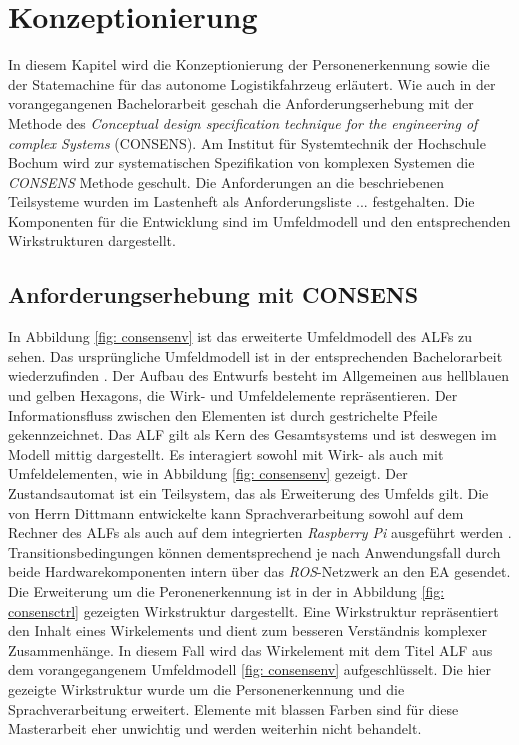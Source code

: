 \chapter{Konzeptionierung}
\label{ch: Konzeptionierung}

In diesem Kapitel wird die Konzeptionierung der Personenerkennung sowie die der Statemachine für das autonome Logistikfahrzeug erläutert. Wie auch in der vorangegangenen Bachelorarbeit geschah die Anforderungserhebung mit der Methode des \textit{Conceptual design specification technique for the engineering of complex Systems} (CONSENS). Am Institut für Systemtechnik der Hochschule Bochum wird zur systematischen Spezifikation von komplexen Systemen die \textit{CONSENS} Methode geschult. Die Anforderungen an die beschriebenen Teilsysteme wurden im Lastenheft als Anforderungsliste ... festgehalten. Die Komponenten für die Entwicklung sind im Umfeldmodell und den entsprechenden Wirkstrukturen dargestellt.
	
	
	\section{Anforderungserhebung mit CONSENS}
	\label{sec: Anforderungserhebung}
	
	In Abbildung \ref{fig: consensenv} ist das erweiterte Umfeldmodell des ALFs zu sehen. Das ursprüngliche Umfeldmodell ist in der entsprechenden Bachelorarbeit wiederzufinden \cite{Bachelorarbeit}. Der Aufbau des Entwurfs besteht im Allgemeinen aus hellblauen und gelben Hexagons, die Wirk- und Umfeldelemente repräsentieren. Der Informationsfluss zwischen den Elementen ist durch gestrichelte Pfeile gekennzeichnet. Das ALF gilt als Kern des Gesamtsystems und ist deswegen im Modell mittig dargestellt. Es interagiert sowohl mit Wirk- als auch mit Umfeldelementen, wie in Abbildung \ref{fig: consensenv} gezeigt. Der Zustandsautomat ist ein Teilsystem, das als Erweiterung des Umfelds gilt. Die von Herrn Dittmann entwickelte kann Sprachverarbeitung sowohl auf dem Rechner des ALFs als auch auf dem integrierten \textit{Raspberry Pi} ausgeführt werden \cite{Dittmann}. Transitionsbedingungen können dementsprechend je nach Anwendungsfall durch beide Hardwarekomponenten intern über das \textit{ROS}-Netzwerk an den EA gesendet.       \\
	
		
	
	Die Erweiterung um die Peronenerkennung ist in der in Abbildung \ref{fig: consensctrl} gezeigten Wirkstruktur dargestellt. Eine Wirkstruktur repräsentiert den Inhalt eines Wirkelements und dient zum besseren Verständnis komplexer Zusammenhänge. In diesem Fall wird das Wirkelement mit dem Titel ALF aus dem vorangegangenem Umfeldmodell \ref{fig: consensenv} aufgeschlüsselt. Die hier gezeigte Wirkstruktur wurde um die Personenerkennung und die Sprachverarbeitung erweitert. Elemente mit blassen Farben sind für diese Masterarbeit eher unwichtig und werden weiterhin nicht behandelt.\\
	
